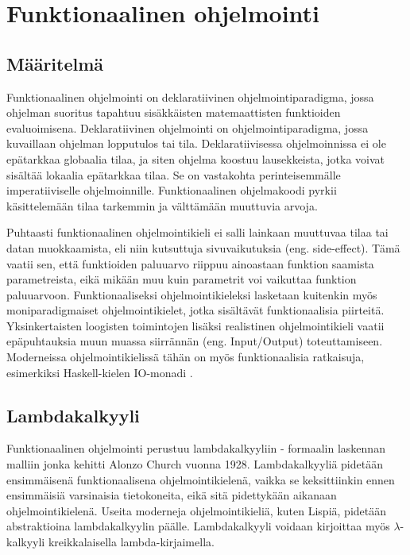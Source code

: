 \chapter{Funktionaalinen ohjelmointi} \label{Funktionaalinen ohjelmointi}

\section{Määritelmä}
Funktionaalinen ohjelmointi on deklaratiivinen ohjelmointiparadigma, jossa ohjelman suoritus tapahtuu sisäkkäisten
matemaattisten funktioiden evaluoimisena. Deklaratiivinen ohjelmointi on ohjelmointiparadigma, jossa kuvaillaan ohjelman
lopputulos tai tila. Deklaratiivisessa ohjelmoinnissa ei ole epätarkkaa globaalia tilaa, ja siten ohjelma koostuu
lausekkeista, jotka voivat sisältää lokaalia epätarkkaa tilaa. Se on vastakohta perinteisemmälle imperatiiviselle 
ohjelmoinnille. Funktionaalinen ohjelmakoodi pyrkii käsittelemään tilaa tarkemmin ja välttämään muuttuvia
arvoja. \cite{hudak}

Puhtaasti funktionaalinen ohjelmointikieli ei salli lainkaan muuttuvaa tilaa tai datan muokkaamista, eli niin kutsuttuja
sivuvaikutuksia (eng. side-effect). Tämä vaatii sen, että funktioiden paluuarvo riippuu ainoastaan funktion saamista
parametreista, eikä mikään muu kuin parametrit voi vaikuttaa funktion paluuarvoon. Funktionaaliseksi ohjelmointikieleksi
lasketaan kuitenkin myös moniparadigmaiset ohjelmointikielet, jotka sisältävät funktionaalisia piirteitä.
Yksinkertaisten loogisten toimintojen lisäksi realistinen ohjelmointikieli vaatii epäpuhtauksia muun muassa siirrännän
(eng. Input/Output) toteuttamiseen. \cite{purelyFunctional} Moderneissa ohjelmointikielissä tähän on myös
funktionaalisia ratkaisuja, esimerkiksi Haskell-kielen IO-monadi \cite{learnhaskell}.

\section{Lambdakalkyyli}
Funktionaalinen ohjelmointi perustuu lambdakalkyyliin - formaalin laskennan malliin jonka kehitti Alonzo Church vuonna
1928. Lambdakalkyyliä pidetään ensimmäisenä funktionaalisena ohjelmointikielenä, vaikka se keksittiinkin ennen
ensimmäisiä varsinaisia tietokoneita, eikä sitä pidettykään aikanaan ohjelmointikielenä. Useita moderneja
ohjelmointikieliä, kuten Lispiä, pidetään abstraktioina lambdakalkyylin päälle. Lambdakalkyyli voidaan kirjoittaa myös
$ \lambda $-kalkyyli kreikkalaisella lambda-kirjaimella. \cite{hudak}

